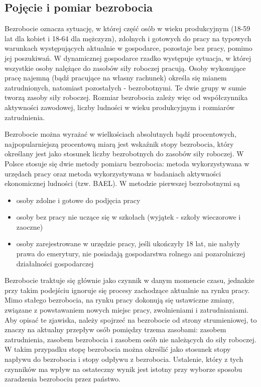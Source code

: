 \documentclass[12pt]{extarticle}
\begin{document}
\subsection{Pojęcie i pomiar bezrobocia}

Bezrobocie oznacza sytuację, w której część osób w wieku produkcyjnym (18-59 lat dla kobiet i 18-64 dla mężczyzn), zdolnych i gotowych do pracy na typowych warunkach występujących aktualnie w gospodarce, pozostaje bez pracy, pomimo jej poszukiwań. W dynamicznej gospodarce rzadko występuje sytuacja, w której wszystkie osoby nalężące do zasobów siły roboczej pracują. Osoby wykonujące pracę najemną (bądź pracujące na własny rachunek) określa się mianem zatrudnionych, natomiast pozostałych - bezrobotnymi. Te dwie grupy w sumie tworzą zasoby siły roboczej. Rozmiar bezrobocia zależy więc od współczynnika aktywności zawodowej, liczby ludności w wieku produkcyjnym i rozmiarów zatrudnienia.

Bezrobocie można wyrażać w wielkościach absolutnych bądź procentowych, najpopularniejszą procentową miarą jest wskaźnik stopy bezrobocia, który określany jest jako stosunek liczby bezrobotnych do zasobów siły roboczej. W Polsce stosuje się dwie metody pomiaru bezrobocia: metoda wykorzystywana w urzędach pracy oraz metoda wykorzystywana w badaniach aktywności ekonomicznej ludności (tzw. BAEL). W metodzie pierwszej bezrobotnymi są

\begin{itemize}
	\item osoby zdolne i gotowe do podjęcia pracy
    \item osoby bez pracy nie uczące się w szkołach (wyjątek - szkoły wieczorowe i zaoczne)
	\item osoby zarejestrowane w urzędzie pracy, jeśli ukończyły 18 lat, nie nabyły prawa do emerytury, nie posiadają gospodarstwa rolnego ani pozarolniczej działalności gospodarczej
\end{itemize}

Bezrobocie traktuje się głównie jako czynnik w danym momencie czasu, jednakże przy takim podejściu ignoruje się procesy zachodzące aktualnie na rynku pracy. Mimo stałego bezrobocia, na rynku pracy dokonują się ustawiczne zmiany, związane z powstawaniem nowych miejsc pracy, zwolnieniami i zatrudnianiami. Aby opisać te zjawiska, należy spojrzeć na bezrobocie od strony strumieniowej, to znaczy na aktualny przepływ osób pomiędzy trzema zasobami: zasobem zatrudnienia, zasobem bezrobocia i zasobem osób nie należących do siły roboczej. W takim przypadku stopę bezrobocia można określić jako stosunek stopy napływu do bezrobocia i stopy odpływu z bezrobocia. Ustalenie, który z tych czynników ma wpływ na ostateczny wynik jest istotny przy wyborze sposobu zaradzenia bezrobociu przez państwo.
\end{document}

